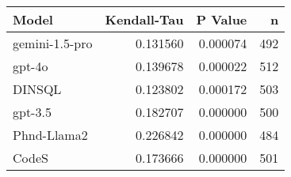 \begin{tabular}{lrrr}
\toprule
Model & Kendall-Tau & P Value & n \\
\midrule
gemini-1.5-pro & 0.131560 & 0.000074 & 492 \\
gpt-4o & 0.139678 & 0.000022 & 512 \\
DINSQL & 0.123802 & 0.000172 & 503 \\
gpt-3.5 & 0.182707 & 0.000000 & 500 \\
Phnd-Llama2 & 0.226842 & 0.000000 & 484 \\
CodeS & 0.173666 & 0.000000 & 501 \\
\bottomrule
\end{tabular}
